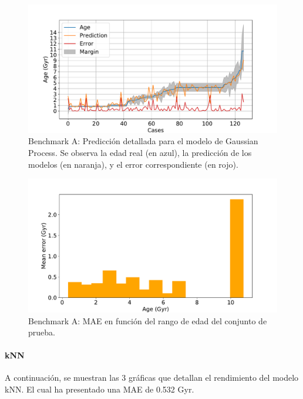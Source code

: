 \begin{figure}[H]
\begin{center}
 \includegraphics[width=0.8\linewidth]{Figuras/Experimentos/B_A_gp_2.pdf}
\end{center}
\caption{Benchmark A: Predicción detallada para el modelo de Gaussian Process. Se observa la edad real (en azul), la predicción de los modelos (en naranja), y el error correspondiente (en rojo).}
 \label{fig:benchA_details_gp_2}
\end{figure}

\begin{figure}[H]
\begin{center}
 \includegraphics[width=0.8\linewidth]{Figuras/Experimentos/B_A_gp_3.pdf}
\end{center}
\caption{Benchmark A: MAE en función del rango de edad del conjunto de prueba.}
 \label{fig:benchA_details_gp_3}
\end{figure}

\paragraph{kNN} 
A continuación, se muestran las 3 gráficas que detallan el rendimiento del modelo kNN. El cual ha presentado una MAE de 0.532 Gyr.

